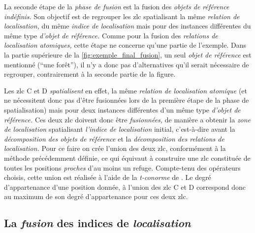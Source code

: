 La seconde étape de la \emph{phase de fusion} est la fusion des
\emph{objets de référence indéfinis.} Son objectif est de regrouper
les \ac{zlc} spatialisant la même \emph{relation de localisation,} du
même \emph{indice de localisation} mais pour des instances différentes
du même type \emph{d'objet de référence.} Comme pour la fusion des
\emph{relations de localisation atomiques,} cette étape ne concerne
qu'une partie de l'exemple. Dans la partie supérieure de la
\autoref{fig:exemple_final_fusion}, un seul \emph{objet de référence}
est mentionné (\enquote{une forêt}), il n'y a donc pas d'alternatives
qu'il serait nécessaire de regrouper, contrairement à la seconde
partie de la figure.

Les \ac{zlc} \textcolor{RdBu-9-8}{\textsf{C}} et
\textcolor{RdBu-9-9}{\textsf{D}} \emph{spatialisent} en effet, la même
\emph{relation de localisation atomique} (et ne nécessitent donc pas
d'être fusionnées lors de la première étape de la phase de
spatialisation) mais pour deux instances différentes d'un même type
\emph{d'objet de référence.} Ces deux \ac{zlc} doivent donc être
\emph{fusionnées,} de manière a obtenir la \emph{zone de localisation}
spatialisant \emph{l'indice de localisation} initial, c'est-à-dire
avant la \emph{décomposition des objets de référence} et la
\emph{décomposition des relations de localisation.} Pour ce faire on
crée l'union des deux \ac{zlc}, conformément à la méthode précédemment
définie, ce qui équivaut à construire une \ac{zlc} constituée de
toutes les positions \emph{proches} d'au moins un refuge. Compte-tenu
des opérateurs choisis, cette union est réalisée à l'aide de la
\emph{t-conorme} de \textcite{Zadeh1965}. Le degré d’appartenance
d'une position donnée, à l'union des \ac{zlc}
\textcolor{RdBu-9-8}{\textsf{C}} et \textcolor{RdBu-9-9}{\textsf{D}}
correspond donc au maximum de son degré d'appartenance pour ces deux
\ac{zlc}.

\subsection{La \emph{fusion} des indices de \emph{localisation}}

